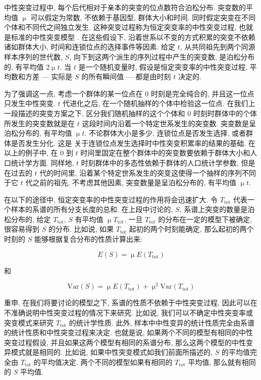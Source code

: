 \documentclass[12pt]{article}
\begin{document}
中性突变过程中, 每个后代相对于亲本的突变的位点数符合泊松分布. 突变数的平均值 $\upmu$ 可以假定为常数,
不依赖于基因型, 群体大小和时间. 同时假定突变在不同个体和不同代之间独立发生.
这种突变过程称为恒定突变率的中性突变过程, 也就是标准的中性突变模型 \parencite{kimura1983,
watterson1975}. 在这些假设下, 沿着世系以不变的方式积累的突变不依赖诸如群体大小,
时间和连锁位点的选择事件等因素. 给定 $t$, 从共同祖先到两个同源样本序列的世代数, $S$,
向下到这两个派生的序列过程中产生的突变数, 是泊松分布的, 有平均值 $2 \upmu t$. 当 $t$
是一个随机变量时, 假设是恒定突变率的中性突变过程, 平均数和方差 --- 实际是 $S$ 的所有瞬间值 ---
都是由时刻 $t$ 决定的.

为了强调这一点, 考虑一个群体的某一位点在 0 时刻是完全纯合的, 并且这一位点只发生中性突变. $t$ 代进化之后,
在一个随机抽样的个体中检验这一位点. 在我们上一段描述的突变方案之下, 区分我们随机抽样的这个个体和 0
时刻时群体中的个体所发生的突变数就是在 $t$ 这段时间内沿着一个特定世系发生的突变数. 突变数是呈泊松分布的,
有平均值 $\upmu t$. 不论群体大小是多少, 连锁位点是否发生选择, 或者群体是否发生分化. 这是
\cite{birky1988} 关于连锁位点发生选择时中性突变积累率的结果的基础. 在以上的例子中, 在 0 到
$t$ 时间里固定在整个群体中的突变数要依赖于群体大小和人口统计学方面. 同样地, $t$
时刻群体中的多态性依赖于群体的人口统计学参数, 但是在过去的 $t$ 代的时间里,
沿着某个特定世系发生的突变这使得一个抽样的序列不同于它 $t$ 代之前的祖先, 不考虑其他因素,
突变数量是呈泊松分布的, 有平均值 $\upmu t$.

在以下的途径中, 恒定突变率的中性突变过程的作用将会迅速扩大. 令 $T_{\text{tot}}$
代表一个样本的系谱的所有分支长度的总和. 在上段中讨论的, $S$, 系谱上突变的数量是泊松分布的, 给定
$T_{\text{tot}}$, $S$ 有平均值 $\upmu T_{\text{tot}}$. 一旦
$T_{\text{tot}}$ 的分布在一定的模型下被确定, 很容易得到 $S$ 的分布. 比如说, 如果
$T_{\text{tot}}$ 起初的两个时刻能确定, 那么起初的两个时刻的 $S$ 能够根据复合分布的性质计算出来:

\begin{equation} \label{eq:1}
    E(S) = \upmu E(T_{\text{tot}})
\end{equation}

和

\begin{equation} \label{eq:2}
    \text{Var}(S) = \upmu E(T_{\text{tot}}) + \upmu ^{2}\text{Var}(T_{\text{tot}})
\end{equation}

重申, 在我们将要讨论的模型之下, 系谱的性质不依赖于中性突变过程, 因此可以在不准确说明中性突变过程的情况下来研究.
比如说, 我们可以不确定中性突变率或突变模式来研究 $T_{\text{tot}}$ 的统计学性质. 此外,
样本中中性变异的统计性质完全由系谱的统计性质和中性突变过程来决定. 也就是说,
如果两个不同的模型有相同的中性突变过程假设, 并且如果这两个模型有相同的系谱分布,
那么这两个模型的中性变异模式就是相同的. 比如说, 如果中性突变模式如我们前面所描述的, $S$ 的平均值完全由
$T_{\text{tot}}$ 的平均值决定. 两个不同的模型如果有相同的 $T_{\text{tot}}$ 平均值,
那么就有相同的 $S$ 平均值.
\end{document}
